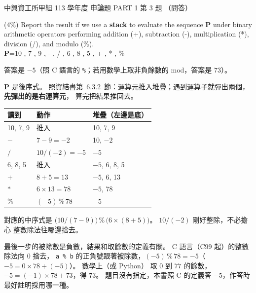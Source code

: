 \begin{pastexam}[label={px:nchu-113-dsa-21}]{中興資工所甲組 113 學年度 申論題 PART 1 第 3 題}
（問答）

(4\%) Report the result if we use a \textbf{stack} to evaluate the sequence \textbf{P} under binary arithmetic
operators performing addition (+), subtraction (-), multiplication (*), division (/), and modulo (\%).\\
\textbf{P}=10 , 7 , 9 , - , / , 6 , 8 , 5 , + , * , \%
\end{pastexam}

\begin{pastsoln}
答案是 $-5$（照 C 語言的 \texttt{\%}；若用數學上取非負餘數的 mod，答案是 $73$）。

$\mathbf{P}$ 是後序式。 照資結書第~6.3.2~節：運算元推入堆疊；遇到運算子就彈出兩個，\textbf{先彈出的是右運算元}，
算完把結果推回去。
\begin{center}
\begin{tabular}{lll}
\toprule
讀到 & 動作 & 堆疊（左邊是底） \\
\midrule
10, 7, 9 & 推入 & 10, 7, 9 \\
$-$ & $7 - 9 = -2$ & 10, $-2$ \\
$/$ & $10 / (-2) = -5$ & $-5$ \\
6, 8, 5 & 推入 & $-5$, 6, 8, 5 \\
$+$ & $8 + 5 = 13$ & $-5$, 6, 13 \\
$*$ & $6 \times 13 = 78$ & $-5$, 78 \\
$\%$ & $(-5) \,\%\, 78$ & $-5$ \\
\bottomrule
\end{tabular}
\end{center}
對應的中序式是 $\bigl(10 / (7 - 9)\bigr) \,\%\, \bigl(6 \times (8 + 5)\bigr)$。 $10 / (-2)$ 剛好整除，不必擔心
整數除法往哪邊捨去。

最後一步的被除數是負數，結果和取餘數的定義有關。 C 語言（C99 起）的整數除法向 $0$ 捨去，
\texttt{a \% b} 的正負號跟著被除數，$(-5) \,\%\, 78 = -5$（$-5 = 0 \times 78 + (-5)$）。 數學上（或 Python）
取 $0$ 到 $77$ 的餘數，$-5 = (-1) \times 78 + 73$，得 $73$。 題目沒有指定，本書照 C 的定義答 $-5$，作答時
最好註明採用哪一種。
\end{pastsoln}
